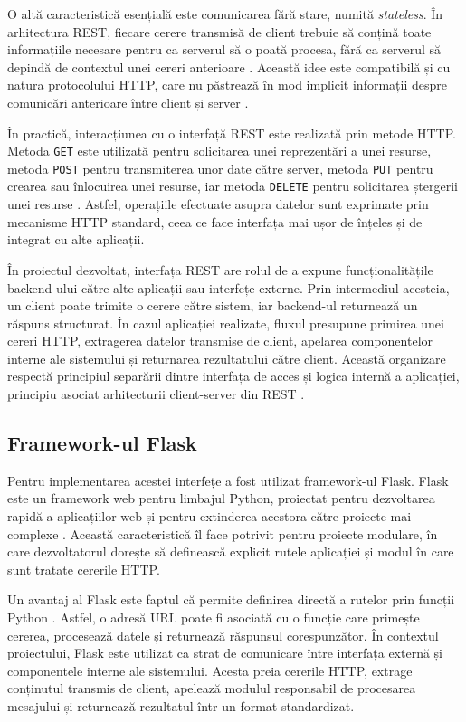 \documentclass[12pt, a4paper, oneside, romanian]{teza-upb}
\begin{document}
O altă caracteristică esențială este comunicarea fără stare, numită \textit{stateless}. În arhitectura REST, fiecare cerere transmisă de client trebuie să conțină toate informațiile necesare pentru ca serverul să o poată procesa, fără ca serverul să depindă de contextul unei cereri anterioare \cite{fielding_rest}. Această idee este compatibilă și cu natura protocolului HTTP, care nu păstrează în mod implicit informații despre comunicări anterioare între client și server \cite{mdn_http}.

În practică, interacțiunea cu o interfață REST este realizată prin metode HTTP. Metoda \texttt{GET} este utilizată pentru solicitarea unei reprezentări a unei resurse, metoda \texttt{POST} pentru transmiterea unor date către server, metoda \texttt{PUT} pentru crearea sau înlocuirea unei resurse, iar metoda \texttt{DELETE} pentru solicitarea ștergerii unei resurse \cite{mdn_http_methods}. Astfel, operațiile efectuate asupra datelor sunt exprimate prin mecanisme HTTP standard, ceea ce face interfața mai ușor de înțeles și de integrat cu alte aplicații.

În proiectul dezvoltat, interfața REST are rolul de a expune funcționalitățile backend-ului către alte aplicații sau interfețe externe. Prin intermediul acesteia, un client poate trimite o cerere către sistem, iar backend-ul returnează un răspuns structurat. În cazul aplicației realizate, fluxul presupune primirea unei cereri HTTP, extragerea datelor transmise de client, apelarea componentelor interne ale sistemului și returnarea rezultatului către client. Această organizare respectă principiul separării dintre interfața de acces și logica internă a aplicației, principiu asociat arhitecturii client-server din REST \cite{fielding_rest}.


\subsection{Framework-ul Flask}


Pentru implementarea acestei interfețe a fost utilizat framework-ul Flask. Flask este un framework web pentru limbajul Python, proiectat pentru dezvoltarea rapidă a aplicațiilor web și pentru extinderea acestora către proiecte mai complexe \cite{flask_doc}. Această caracteristică îl face potrivit pentru proiecte modulare, în care dezvoltatorul dorește să definească explicit rutele aplicației și modul în care sunt tratate cererile HTTP.

Un avantaj al Flask este faptul că permite definirea directă a rutelor prin funcții Python \cite{flask_doc}. Astfel, o adresă URL poate fi asociată cu o funcție care primește cererea, procesează datele și returnează răspunsul corespunzător. În contextul proiectului, Flask este utilizat ca strat de comunicare între interfața externă și componentele interne ale sistemului. Acesta preia cererile HTTP, extrage conținutul transmis de client, apelează modulul responsabil de procesarea mesajului și returnează rezultatul într-un format standardizat.
\end{document}
